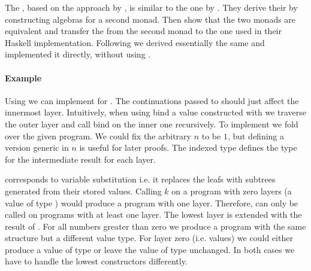 The , based on the approach by
\textcite{DBLP:journals/corr/abs-1806-05230}, is similar to the one by
\textcite{DBLP:conf/lics/PirogSWJ18}.
They derive their  by constructing algebras for a
second monad.
Then \textcite{DBLP:conf/lics/PirogSWJ18} show that the two monads are
equivalent and transfer the  from the
second monad to the one used in their Haskell implementation.
Following \textcite{DBLP:journals/corr/abs-1806-05230} we derived essentially the
same  and implemented it directly, without using
\AgdaFunction{>>=}.

\paragraph{Example}
Using  we can implement \AgdaFunction{>>=} for
\AgdaSpace{}\AgdaSpace{}.
The continuations  passed to \AgdaFunction{>>=} should just
affect the innermost layer.
Intuitively, when using bind a value constructed with
 we traverse the outer layer and call bind on the
inner one recursively.
To implement \AgdaFunction{>>=} we fold over the given program.
We could fix the arbitrary $n$ to be $1$, but defining a version generic in $n$
is useful for later proofs.
The  indexed type  defines the type for the
intermediate result for each layer.

\AgdaFunction{>>=} corresponds to variable substitution i.e. it replaces the
 leafs with subtrees generated from their stored
values.
Calling $k$ on a program with zero layers (a value of type )
would produce a program with one layer.
Therefore, \bind{} can only be called on programs with at least one layer.
The lowest layer is extended with the result of .
For all numbers greater than zero we produce a program with the same structure
but a different value type.
For layer zero (i.e. values) we could either produce a value of type 
\AgdaSpace{}\AgdaSpace{}
or leave the value of type  unchanged.
In both cases we have to handle the lowest 
constructors differently.

